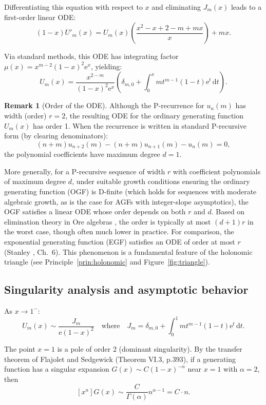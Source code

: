 \documentclass[11pt,reqno]{amsart}
\theoremstyle{definition}
\newtheorem{remark}[theorem]{Remark}
\newcommand{\dd}{\mathrm{d}}
\newcommand{\ee}{\mathrm{e}}
\numberwithin{equation}{section}
\begin{document}
Differentiating this equation with respect to $x$ and eliminating $J_m(x)$ leads to a first-order linear ODE:
\[
(1-x)U'_m(x) = U_m(x) \left(\frac{x^2-x+2-m+mx}{x}\right) + mx.
\]

Via standard methods, this ODE has integrating factor $\mu(x) = x^{m-2}(1-x)^2\ee^x$, yielding:
\[
U_m(x) = \frac{x^{2-m}}{(1-x)^2\ee^x}\left(\delta_{m,0} + \int_0^x mt^{m-1}(1-t)\ee^t\, \dd t\right).
\]

\begin{remark}[Order of the ODE]\label{rem:order-ode}
Although the P-recurrence for $u_n(m)$ has width (order) $r=2$, the resulting ODE for the ordinary generating function $U_m(x)$ has order 1. When the recurrence is written in standard P-recursive form (by clearing denominators):
$$(n+m)u_{n+2}(m) - (n+m)u_{n+1}(m) - u_n(m) = 0,$$
the polynomial coefficients have maximum degree $d=1$. 

More generally, for a P-recursive sequence of width $r$ with coefficient polynomials of maximum degree $d$, under suitable growth conditions ensuring the ordinary generating function (OGF) is D-finite (which holds for sequences with moderate algebraic growth, as is the case for AGFs with integer-slope asymptotics), the OGF satisfies a linear ODE whose order depends on both $r$ and $d$. Based on elimination theory in Ore algebras \cite{ChyzakSalvy1998,Koutschan2010}, the order is typically at most $(d+1)r$ in the worst case, though often much lower in practice. For comparison, the exponential generating function (EGF) satisfies an ODE of order at most $r$ (Stanley \cite{Stanley1999}, Ch.~6). This phenomenon is a fundamental feature of the holonomic triangle (see Principle~\ref{prin:holonomic} and Figure~\ref{fig:triangle}).
\end{remark}

\subsection{Singularity analysis and asymptotic behavior}

As $x\to 1^-$: 
$$U_m(x) \sim \frac{J_m}{\ee(1-x)^{2}} \quad\text{where}\quad J_m = \delta_{m,0} + \int_0^1 mt^{m-1}(1-t)\ee^t\, \dd t.$$

The point $x=1$ is a pole of order 2 (dominant singularity). By the transfer theorem of Flajolet and Sedgewick \cite{FlajoletSedgewick2009} (Theorem VI.3, p.393), if a generating function has a singular expansion $G(x) \sim C(1-x)^{-\alpha}$ near $x=1$ with $\alpha = 2$, then
$$[x^n]G(x) \sim \frac{C}{\Gamma(\alpha)} n^{\alpha-1} = C \cdot n.$$
\end{document}
